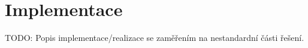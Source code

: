 \chapter{Implementace}

TODO: Popis implementace/realizace se zaměřením na nestandardní části řešení.
